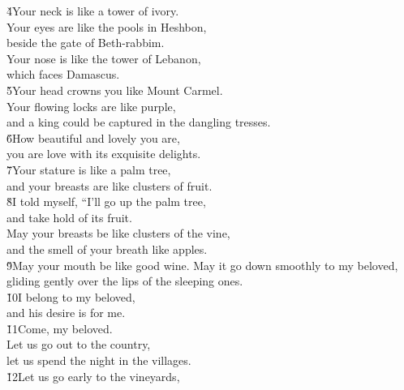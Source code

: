 \begin{poetry}
\poeml \v{4}Your neck is like a tower of ivory. \\
\poemll    Your eyes are like the pools in Heshbon, \\
\poemlll       beside the gate of Beth-rabbim. \\
\poeml Your nose is like the tower of Lebanon, \\
\poemll    which faces Damascus. \\
\poeml \v{5}Your head crowns you like Mount Carmel. \\
\poemll    Your flowing locks are like purple, \\
\poemlll       and a king could be captured in the dangling tresses. \\
\poeml \v{6}How beautiful and lovely you are, \\
\poemll    you are love with its exquisite delights. \\
\poeml \v{7}Your stature is like a palm tree, \\
\poemll    and your breasts are like clusters of fruit. \\
\poeml \v{8}I told myself, ``I'll go up the palm tree, \\
\poemll    and take hold of its fruit. \\
\poeml May your breasts be like clusters of the vine, \\
\poemll    and the smell of your breath like apples. \\
\poeml \v{9}May your mouth be like good wine.
\poeml May it go down smoothly to my beloved, \\
\poemll    gliding gently over the lips of the sleeping ones. \\
\poeml \v{10}I belong to my beloved, \\
\poemll    and his desire is for me. \\
\poeml \v{11}Come, my beloved. \\
\poemll    Let us go out to the country, \\
\poemlll       let us spend the night in the villages. \\
\poeml \v{12}Let us go early to the vineyards, \\

\end{poetry}
